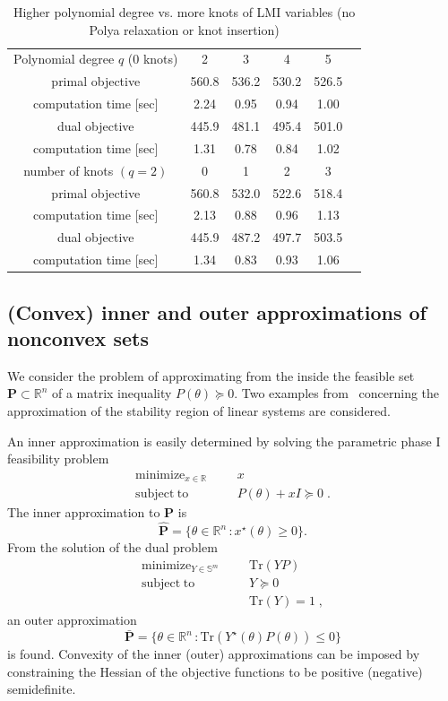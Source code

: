 \documentclass{article}
\DeclareMathOperator*{\minimize}{minimize}
\DeclareMathOperator*{\subj}{subject\;to}
\newcommand{\R}{\mathbb{R}}         %
\renewcommand{\S}{\mathbb{S}}       %
\newcommand{\Tr}{\mathrm{Tr}}       %
\newcommand{\opt}{\star}                    %
\newcommand{\ppar}{\theta}                          %
\begin{document}
\begin{table}
	\centering
	\caption{Higher polynomial degree vs. more knots of LMI variables (no Polya relaxation or knot insertion)} \vspace{0.2cm}
	\label{tab:incdeg_knot}
	\begin{tabular}{cccccc}
		\toprule
	  Polynomial degree $q$ (0 knots) & 2     & 3     & 4     & 5     \\
	  primal objective                & 560.8 & 536.2 & 530.2 & 526.5 \\
	  computation time [sec]  	      & 2.24  & 0.95  & 0.94  & 1.00  \\
	  dual objective          	      & 445.9 & 481.1 & 495.4 & 501.0 \\
	  computation time [sec]  	      & 1.31  & 0.78  & 0.84  & 1.02  \\
	  \midrule
	  number of knots $(q = 2)$       & 0     & 1     & 2     & 3     \\
	  primal objective                & 560.8 & 532.0 & 522.6 & 518.4 \\
	  computation time [sec]          & 2.13  & 0.88  & 0.96  & 1.13  \\
	  dual objective                  & 445.9 & 487.2 & 497.7 & 503.5 \\
	  computation time [sec]          & 1.34  & 0.83  & 0.93  & 1.06  \\
		\bottomrule
	\end{tabular}
\end{table}


\subsection{(Convex) inner and outer approximations of nonconvex sets}
We consider the problem of approximating from the inside the feasible set $
\mathbf{P} \subset \R^n$ of a matrix inequality $P(\ppar) \succeq 0$. Two examples
from~\cite{Henrion_Lasserre_2012} concerning the approximation of the stability region of linear
systems are considered.

An inner approximation is easily determined by solving the parametric phase I feasibility
problem
\[
\begin{aligned}
\minimize_{x\in\R} &&& x \\
\subj              &&& P(\theta) + xI \succeq 0 \; .%
\end{aligned}
\]
The inner approximation to $\mathbf{P}$ is
\[
\mathbf{\hat{P}} = \{\ppar \in \R^n \, : x^\opt(\ppar) \geq 0 \}.
\]
From the solution of the dual problem
\[
\begin{aligned}
\minimize_{Y\in \S^m} &&& \Tr(YP) \\
\subj              &&& Y \succeq 0 \\
                   &&& \Tr(Y) = 1 \; ,%
\end{aligned}
\]
an outer approximation
\[
\mathbf{\bar{P}} = \{\ppar \in \R^n \, : \Tr(Y^\opt(\ppar) P(\ppar)) \leq 0 \}
\]
is found. Convexity of the inner (outer) approximations can be imposed by
constraining the Hessian of the objective functions to be positive (negative)
semidefinite.
\end{document}

